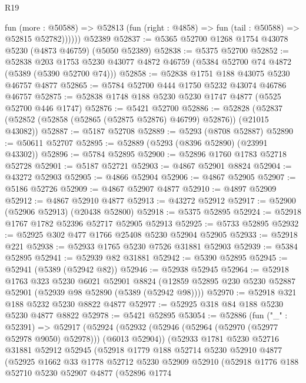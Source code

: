 \begin{lexlean}{R19}
\begin{coremodule}
            fun (more : @50588) =>
            @52813 (fun (right : @4858) => fun (tail : @50588) => @52815 @52782))))))
    @52389
@52837 := @5365 @52700 @1268 @1754 @43078 @5230 (@4873 @46759) (@5050 @52389)
@52838 := @5375 @52700
@52852 := @52838
    @203
    @1753
    @5230
    @43077
    @4872
    @46759
    (@5384 @52700 @74 @4872 (@5389 (@5390 @52700 @74)))
@52858 := @52838 @1751 @188 @43075 @5230 @46757 @4877
@52865 := @5784 @52700 @444 @1750 @5232 @43074 @46786 @46757
@52875 := @52838 @1748 @188 @5230 @5230 @1747 @4877 (@5525 @52700 @446 @1747)
@52876 := @5421 @52700
@52886 := @52828 (@52837 (@52852 (@52858 (@52865 (@52875 @52876) @46799) @52876)) (@21015 @43082))
@52887 := @5187 @52708
@52889 := @5293 (@8708 @52887)
@52890 := @50611 @52707
@52895 := @52889 (@5293 (@8396 @52890) (@23991 @43302))
@52896 := @5784 @52895
@52900 := @52896 @1760 @1783 @52718 @52728
@52901 := @5187 @52721
@52903 := @4867 @52901 @8824
@52904 := @43272 @52903
@52905 := @4866 @52904
@52906 := @4867 @52905
@52907 := @5186 @52726
@52909 := @4867 @52907 @4877
@52910 := @4897 @52909
@52912 := @4867 @52910 @4877
@52913 := @43272 @52912
@52917 := @52900 (@52906 @52913) (@20438 @52800)
@52918 := @5375 @52895
@52924 := @52918 @1767 @1782 @52396 @52717 @52905 @52913
@52925 := @5733 @52895
@52932 := @52925 @302 @477 @1766 @25408 @5230 @52904 @52905
@52933 := @52918 @221
@52938 := @52933 @1765 @5230 @7526 @31881 @52903
@52939 := @5384 @52895
@52941 := @52939 @82 @31881
@52942 := @5390 @52895
@52945 := @52941 (@5389 (@52942 @82))
@52946 := @52938 @52945
@52964 := @52918
    @1763
    @323
    @5230
    @6021
    @52901
    @8824
    (@12859 @52895 @230 @5230 @52887 @52901 (@52939 @98 @52890 (@5389 (@52942 @98))))
@52970 := @52918 @321 @188 @5232 @5230 @8822 @4877
@52977 := @52925 @318 @84 @188 @5230 @5230 @4877 @8822
@52978 := @5421 @52895
@53054 := @52886
    (fun ("_" : @52391) =>
    @52917
      (@52924
        (@52932 (@52946 (@52964 (@52970 (@52977 @52978 @9050) @52978))) (@6013 @52904))
        (@52933
          @1781
          @5230
          @52716
          @31881
          @52912
          @52945
          (@52918
            @1779
            @188
            @52714
            @5230
            @52910
            @4877
            (@52925
              @1662
              @33
              @1778
              @52712
              @5230
              @52909
              @52910
              (@52918
                @1776
                @188
                @52710
                @5230
                @52907
                @4877
                (@52896
                  @1774

\end{coremodule}
\end{lexlean}
